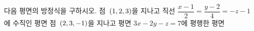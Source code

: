 다음 평면의 방정식을 구하시오.
 점~$(1{,}\mkern3mu\mathopen{}2{,}\mkern3mu\mathopen{}3)$을 지나고 직선 $\dfrac{x-1}{2}=\dfrac{y-2}{4}=-z-1$에 수직인 평면
 점~$(2{,}\mkern3mu\mathopen{}3{,}\mkern3mu\mathopen{}-1)$을 지나고 평면 $3x-2y-z=7$에 평행한 평면
